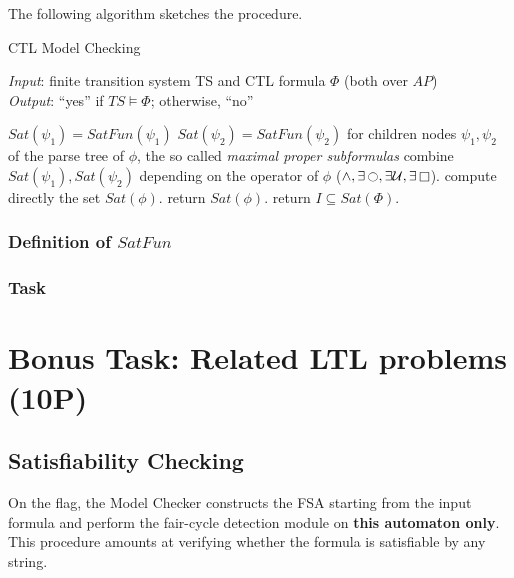 \documentclass{article}
\begin{document}
The following algorithm sketches the procedure. 
\label{subsec-CTLmca}
\begin{algorithm}[H]
    \caption{CTL Model Checking}
    \label{alg:CTLmc}
    \hspace*{\algorithmicindent} \emph{Input}: finite transition system TS and CTL formula $\Phi$ (both over $AP$) \\
    \hspace*{\algorithmicindent} \emph{Output}: ``yes'' if $TS \vDash \Phi$; otherwise, ``no''
    \begin{algorithmic}[1]
            \State $Sat(\psi_1) = SatFun(\psi_1)$ 
            \State $Sat(\psi_2) = SatFun(\psi_2)$ 
            for children nodes $\psi_1, \psi_2$ of the parse tree of $\phi$, the so called \emph{maximal proper subformulas}
            \State combine $Sat(\psi_1), Sat(\psi_2)$ depending on the operator of $\phi$ ($\land, \exists\mathop{\ocircle}, \exists\mathbin{\mathcal{U}}, \exists\mathop{\square}$).
        \Else
            \State compute directly the set $Sat(\phi)$.
        \EndIf
        \State return $Sat(\phi)$.
    \EndFunction
    \State return $I \subseteq Sat(\Phi)$.
    \end{algorithmic}
\end{algorithm}

\subsubsection*{Definition of $SatFun$}


\subsubsection*{Task}


\section{Bonus Task: Related LTL problems (10P)} \label{sec::bonus1}

\subsection{Satisfiability Checking}
On the  flag, the Model Checker constructs the FSA starting from the input formula
and perform the fair-cycle detection module on \textbf{this automaton only}. 
This procedure amounts at verifying whether the formula is satisfiable by any string. 
\end{document}

